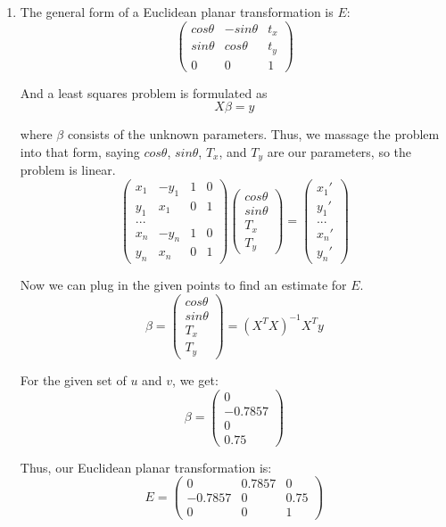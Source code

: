 \documentclass[11pt]{article}
\begin{document}
\begin{enumerate}
\item
    The general form of a Euclidean planar transformation is $E$:
    $$\begin{pmatrix}cos\theta&-sin\theta&t_x\\sin\theta&cos\theta&t_y\\
    0&0&1\end{pmatrix}$$

    And a least squares problem is formulated as
    $$X\beta = y$$

    where $\beta$ consists of the unknown parameters.  Thus, we massage the
    problem into that form, saying $cos\theta$, $sin\theta$, $T_x$, and $T_y$
    are our parameters, so the problem is linear.
    $$\begin{pmatrix}x_1&-y_1&1&0\\y_1&x_1&0&1\\...\\x_n&-y_n&1&0\\y_n&x_n&0&1\end{pmatrix}
    \begin{pmatrix}cos\theta\\sin\theta\\T_x\\T_y\end{pmatrix} =
    \begin{pmatrix}x_1'\\y_1'\\...\\x_n'\\y_n'\end{pmatrix}$$

    Now we can plug in the given points to find an estimate for $E$.
    $$\beta = \begin{pmatrix}cos\theta\\sin\theta\\T_x\\T_y\end{pmatrix} = 
        (X^TX)^{-1}X^Ty$$

    For the given set of $u$ and $v$, we get:
    $$\beta = \begin{pmatrix}0\\-0.7857\\0\\0.75\end{pmatrix}$$

    Thus, our Euclidean planar transformation is:
    $$E = \begin{pmatrix}0&0.7857&0\\-0.7857&0&0.75\\0&0&1\end{pmatrix}$$


\end{enumerate}
\end{document}
